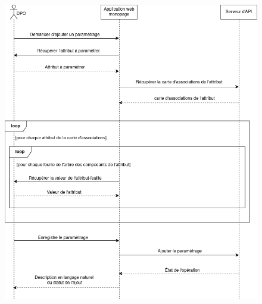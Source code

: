 \begin{figure}[H]
    \centering
    \includegraphics[width=\textwidth]{images/sequence-diagram-value-creation.png}
\end{figure}